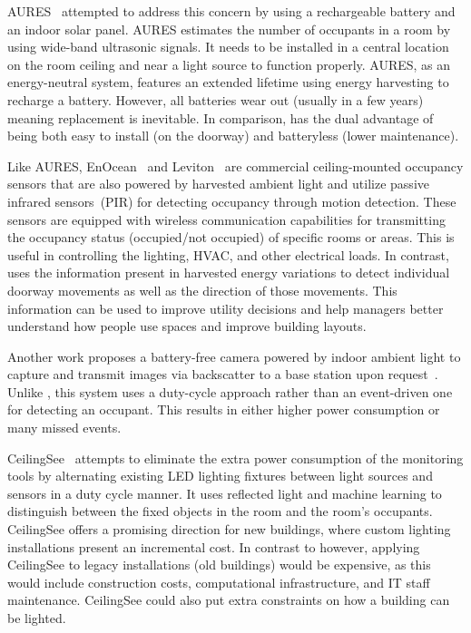 AURES~\cite{shih2016aures} attempted to address this concern by using a rechargeable battery and an indoor solar panel.
AURES estimates the number of occupants in a room by using wide-band ultrasonic signals.
It needs to be installed in a central location on the room ceiling and near a light source to function properly.
AURES, as an energy-neutral system, features an extended lifetime using energy harvesting to recharge a battery.
However, all batteries wear out (usually in a few years) meaning replacement is inevitable.
In comparison, \sysname has the dual advantage of being both easy to install (on the doorway) and batteryless (lower maintenance).

Like AURES, EnOcean~\cite{EnOcean} and Leviton~\cite{Leviton} are commercial ceiling-mounted occupancy sensors that are also powered by harvested ambient light and utilize passive infrared sensors~(PIR) for detecting occupancy through motion detection. These sensors are equipped with wireless communication capabilities for transmitting the occupancy status (occupied/not occupied) of specific rooms or areas. This is useful in controlling the lighting, HVAC, and other electrical loads. In contrast, \sysname uses the information present in harvested energy variations to detect individual doorway movements as well as the direction of those movements. This information can be used to improve utility decisions and help managers better understand how people use spaces and improve building layouts.

Another work proposes a battery-free camera powered by indoor ambient light to capture and transmit images via backscatter to a base station upon request~\cite{saffari2021battery}. 
Unlike \sysname, this system uses a duty-cycle approach rather than an event-driven one for detecting an occupant. 
This results in either higher power consumption or many missed events.

CeilingSee~\cite{yang2017ceilingsee} attempts to eliminate the extra power consumption of the monitoring tools by alternating existing LED lighting fixtures between light sources and sensors in a duty cycle manner.
It uses reflected light and machine learning to distinguish between the fixed objects in the room and the room's occupants.
CeilingSee offers a promising direction for new buildings, where custom lighting installations present an incremental cost. 
In contrast to \sysname however, applying CeilingSee to legacy installations (old buildings) would be expensive, as this would include construction costs, computational infrastructure, and IT staff maintenance.
CeilingSee could also put extra constraints on how a building can be lighted.

